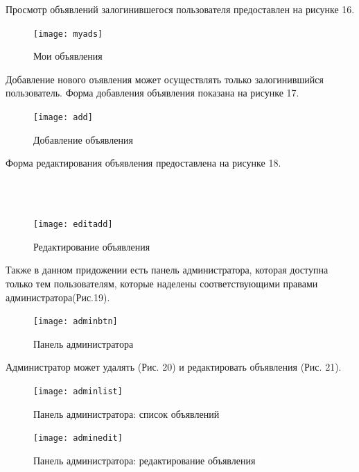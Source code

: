 \documentclass[14pt,a4paper]{extreport}
\begin{document}
	Просмотр объявлений залогинившегося пользователя предоставлен на рисунке 16.\par
	\begin{figure}[h!]
	\begin{center}
	\texttt{[image: myads]}
	\caption{Мои объявления}
	\end{center}
	\end{figure}  

	Добавление нового оъявления может осуществлять только залогинившийся пользователь. Форма добавления объявления показана на рисунке 17.\par
	\begin{figure}[h]
	\begin{center}
	\texttt{[image: add]}
	\caption{Добавление объявления}
	\end{center}
	\end{figure}  

	Форма редактирования объявления предоставлена на рисунке 18.\par
~\\~\\
	\begin{figure}[h!]
	\begin{center}
	\texttt{[image: editadd]}
	\caption{Редактирование объявления}
	\end{center}
	\end{figure}  

	Также в данном придожении есть панель администратора, которая доступна только тем пользователям, которые наделены соответствующими правами администратора(Рис.19).\par
	\begin{figure}[h]
	\begin{center}
	\texttt{[image: adminbtn]}
	\caption{Панель администратора}
	\end{center}
	\end{figure}  

	Администратор может удалять (Рис. 20) и редактировать объявления (Рис. 21).\par
	\begin{figure}[h]
	\begin{center}
	\texttt{[image: adminlist]}
	\caption{Панель администратора: список объявлений}
	\end{center}
	\end{figure}  

	\begin{figure}[h]
	\begin{center}
	\texttt{[image: adminedit]}
	\caption{Панель администратора: редактирование объявления}
	\end{center}
	\end{figure}  
\end{document}
